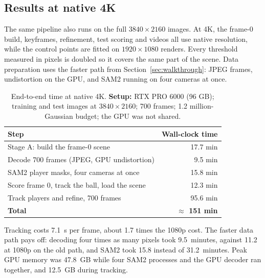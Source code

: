 \documentclass[11pt]{article}
\begin{document}
\subsection{Results at native 4K}\label{sec:4k}
The same pipeline also runs on the full $3840\times2160$ images. At 4K, the frame-0 build, keyframes,
refinement, test scoring and videos all use native resolution, while the control points are fitted on
$1920\times1080$ renders. Every threshold measured in pixels is doubled so it covers the same part of
the scene. Data preparation uses the faster path from Section~\ref{sec:walkthrough}: JPEG frames,
undistortion on the GPU, and SAM2 running on four cameras at once.

\begin{table}[!htbp]\centering
\caption{End-to-end time at native 4K. \textbf{Setup:} RTX PRO 6000 (96 GB); training and test
images at $3840\times2160$; 700 frames; 1.2 million-Gaussian budget; the GPU was not shared.}\label{tab:e2e-4k}
\small\begin{tabular}{lr}\toprule
Step & Wall-clock time \\\midrule
Stage A: build the frame-0 scene & 17.7 min \\
Decode 700 frames (JPEG, GPU undistortion) & 9.5 min \\
SAM2 player masks, four cameras at once & 15.8 min \\
Score frame 0, track the ball, load the scene & 12.3 min \\
Track players and refine, 700 frames & 95.6 min \\\midrule
\textbf{Total} & \textbf{$\approx$ 151 min} \\\bottomrule
\end{tabular}\end{table}
Tracking costs 7.1~s per frame, about 1.7 times the 1080p cost. The faster data path pays off:
decoding four times as many pixels took 9.5~minutes, against 11.2 at 1080p on the old path, and SAM2
took 15.8 instead of 31.2~minutes. Peak GPU memory was 47.8~GB while four SAM2 processes and the GPU
decoder ran together, and 12.5~GB during tracking.
\end{document}
